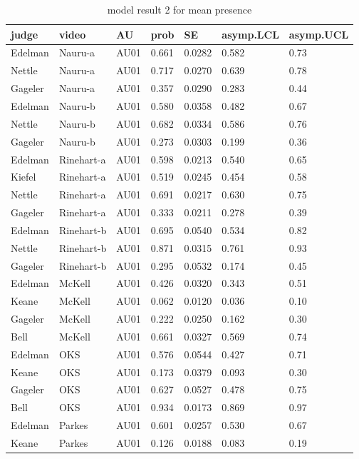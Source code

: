 \documentclass{monashthesis}
\begin{document}
\begin{center}
\begin{longtable}{lllllll}
\caption{model result 2 for mean presence}\\
\toprule
judge & video & AU & prob & SE & asymp.LCL & asymp.UCL \\
\midrule
\endhead
\bottomrule
\endfoot
Edelman & Nauru-a & AU01 & 0.661 & 0.0282 & 0.582 & 0.73 \\
Nettle & Nauru-a & AU01 & 0.717 & 0.0270 & 0.639 & 0.78 \\
Gageler & Nauru-a & AU01 & 0.357 & 0.0290 & 0.283 & 0.44 \\
Edelman & Nauru-b & AU01 & 0.580 & 0.0358 & 0.482 & 0.67 \\
Nettle & Nauru-b & AU01 & 0.682 & 0.0334 & 0.586 & 0.76 \\
Gageler & Nauru-b & AU01 & 0.273 & 0.0303 & 0.199 & 0.36 \\
Edelman & Rinehart-a & AU01 & 0.598 & 0.0213 & 0.540 & 0.65 \\
Kiefel & Rinehart-a & AU01 & 0.519 & 0.0245 & 0.454 & 0.58 \\
Nettle & Rinehart-a & AU01 & 0.691 & 0.0217 & 0.630 & 0.75 \\
Gageler & Rinehart-a & AU01 & 0.333 & 0.0211 & 0.278 & 0.39 \\
Edelman & Rinehart-b & AU01 & 0.695 & 0.0540 & 0.534 & 0.82 \\
Nettle & Rinehart-b & AU01 & 0.871 & 0.0315 & 0.761 & 0.93 \\
Gageler & Rinehart-b & AU01 & 0.295 & 0.0532 & 0.174 & 0.45 \\
Edelman & McKell & AU01 & 0.426 & 0.0320 & 0.343 & 0.51 \\
Keane & McKell & AU01 & 0.062 & 0.0120 & 0.036 & 0.10 \\
Gageler & McKell & AU01 & 0.222 & 0.0250 & 0.162 & 0.30 \\
Bell & McKell & AU01 & 0.661 & 0.0327 & 0.569 & 0.74 \\
Edelman & OKS & AU01 & 0.576 & 0.0544 & 0.427 & 0.71 \\
Keane & OKS & AU01 & 0.173 & 0.0379 & 0.093 & 0.30 \\
Gageler & OKS & AU01 & 0.627 & 0.0527 & 0.478 & 0.75 \\
Bell & OKS & AU01 & 0.934 & 0.0173 & 0.869 & 0.97 \\
Edelman & Parkes & AU01 & 0.601 & 0.0257 & 0.530 & 0.67 \\
Keane & Parkes & AU01 & 0.126 & 0.0188 & 0.083 & 0.19 \\

\end{longtable}
\end{center}
\end{document}
